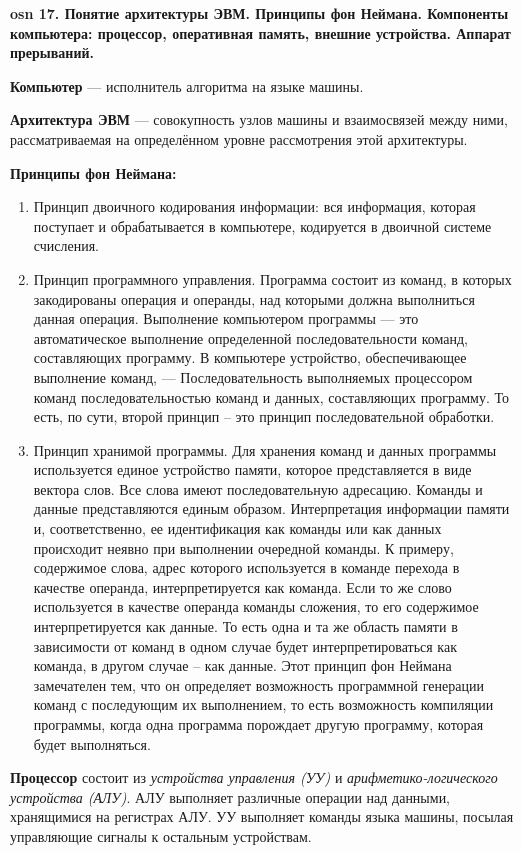 \textbf{\LARGE osn 17. Понятие архитектуры ЭВМ. Принципы фон Неймана. Компоненты компьютера: процессор, оперативная память, внешние устройства. Аппарат прерываний.}


\textbf{Компьютер} --- исполнитель алгоритма на языке машины.

\textbf{Архитектура ЭВМ} --- совокупность узлов машины и взаимосвязей между ними, рассматриваемая на определённом уровне рассмотрения этой архитектуры.

\textbf{Принципы фон Неймана:}
\begin{enumerate}
    \item Принцип двоичного кодирования информации: вся информация, которая поступает и обрабатывается в компьютере, кодируется в двоичной системе счисления.
    \item Принцип программного управления. Программа состоит из команд, в которых закодированы операция и операнды, над которыми должна выполниться данная операция. Выполнение компьютером программы — это автоматическое выполнение определенной последовательности команд, составляющих программу. В компьютере устройство, обеспечивающее выполнение команд, — Последовательность выполняемых процессором команд последовательностью команд и данных, составляющих программу. То есть, по сути, второй принцип – это принцип последовательной обработки.
    \item Принцип хранимой программы. Для хранения команд и данных программы используется единое устройство памяти, которое представляется в виде вектора слов. Все слова имеют последовательную адресацию. Команды и данные представляются единым образом. Интерпретация информации памяти и, соответственно, ее идентификация как команды или как данных происходит неявно при выполнении очередной команды. К примеру, содержимое слова, адрес которого используется в команде перехода в качестве операнда, интерпретируется как команда. Если то же слово используется в качестве операнда команды сложения, то его содержимое интерпретируется как данные. То есть одна и та же область памяти в зависимости от команд в одном случае будет интерпретироваться как команда, в другом случае – как данные. Этот принцип фон Неймана замечателен тем, что он определяет возможность программной генерации команд с последующим их выполнением, то есть возможность компиляции программы, когда одна программа порождает другую программу, которая будет выполняться.
\end{enumerate}

\textbf{Процессор} состоит из \textit{устройства управления (УУ)} и \textit{арифметико-логического устройства (АЛУ)}. АЛУ выполняет различные операции над данными, хранящимися на регистрах АЛУ. УУ выполняет команды языка машины, посылая управляющие сигналы к остальным устройствам.

